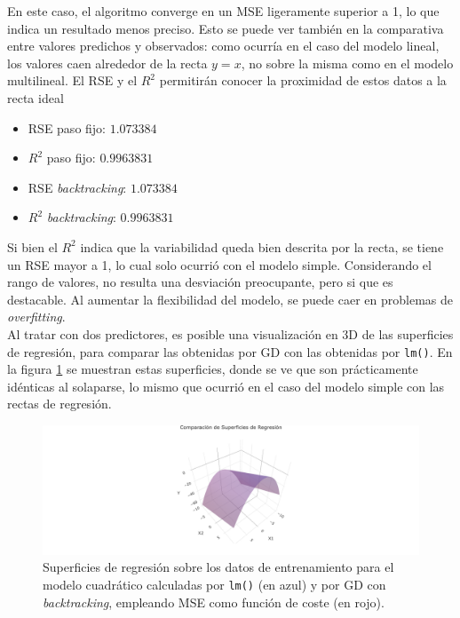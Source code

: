\documentclass[11pt]{opticajnl}
\begin{document}
En este caso, el algoritmo converge en un MSE ligeramente superior a 1, lo que indica un resultado menos preciso. Esto se puede ver también en la comparativa entre valores predichos y observados: como ocurría en el caso del modelo lineal, los valores caen alrededor de la recta $y=x$, no sobre la misma como en el modelo multilineal. El RSE y el $R^2$ permitirán conocer la proximidad de estos datos a la recta ideal
\begin{multicols}{2}
\begin{itemize}
\item RSE paso fijo: $1.073384$ 
\item $R^2$ paso fijo: $0.9963831$ 
\item RSE \textit{backtracking}: $1.073384$
\item $R^2$ \textit{backtracking}: $0.9963831$
\end{itemize}
\end{multicols}

Si bien el $R^2$ indica que la variabilidad queda bien descrita por la recta, se tiene un RSE mayor a 1, lo cual solo ocurrió con el modelo simple. Considerando el rango de valores, no resulta una desviación preocupante, pero si que es destacable. Al aumentar la flexibilidad del modelo, se puede caer en problemas de \textit{overfitting}. \\

Al tratar con dos predictores, es posible una visualización en 3D de las superficies de regresión, para comparar las obtenidas por GD con las obtenidas por \texttt{lm()}. En la figura \ref{fig:4} se muestran estas superficies, donde se ve que son prácticamente idénticas al solaparse, lo mismo que ocurrió en el caso del modelo simple con las rectas de regresión.

\begin{figure}[H]
\centering
\includegraphics[width=\textwidth]{fotos/sup.png}
\caption{Superficies de regresión sobre los datos de entrenamiento para el modelo cuadrático calculadas por \texttt{lm()} (en azul) y por GD con \textit{backtracking}, empleando MSE como función de coste (en rojo).}
\label{fig:4}
\end{figure}
\end{document}
